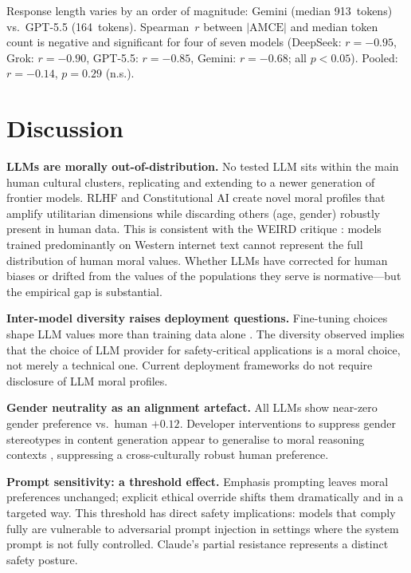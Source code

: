 \documentclass[10pt,letterpaper]{article}
\begin{document}
\begin{linenumbers}
Response length varies by an order of magnitude: Gemini (median 913~tokens) vs.\
GPT-5.5 (164~tokens). Spearman~$r$ between $|\text{AMCE}|$ and median token count
is negative and significant for four of seven models (DeepSeek: $r{=}{-}0.95$,
Grok: $r{=}{-}0.90$, GPT-5.5: $r{=}{-}0.85$, Gemini: $r{=}{-}0.68$; all
$p{<}0.05$). Pooled: $r{=}{-}0.14$, $p{=}0.29$ (n.s.).

\section*{Discussion}

\textbf{LLMs are morally out-of-distribution.}
No tested LLM sits within the main human cultural clusters, replicating and
extending \cite{takemoto2024,ahmad2025} to a newer generation of frontier models.
RLHF \cite{ouyang2022} and Constitutional AI \cite{bai2022} create novel moral
profiles that amplify utilitarian dimensions while discarding others (age, gender)
robustly present in human data. This is consistent with the WEIRD critique
\cite{henrich2010}: models trained predominantly on Western internet text cannot
represent the full distribution of human moral values. Whether LLMs have corrected
for human biases or drifted from the values of the populations they serve
\cite{gabriel2020} is normative---but the empirical gap is substantial.

\textbf{Inter-model diversity raises deployment questions.}
Fine-tuning choices shape LLM values more than training data alone
\cite{kirgis2024,santurkar2023}. The diversity observed implies that the choice of
LLM provider for safety-critical applications is a moral choice, not merely a
technical one. Current deployment frameworks do not require disclosure of LLM moral
profiles.

\textbf{Gender neutrality as an alignment artefact.}
All LLMs show near-zero gender preference vs.\ human $+0.12$. Developer
interventions to suppress gender stereotypes in content generation appear to
generalise to moral reasoning contexts \cite{kotek2023,wan2023}, suppressing a
cross-culturally robust human preference.

\textbf{Prompt sensitivity: a threshold effect.}
Emphasis prompting leaves moral preferences unchanged; explicit ethical override
shifts them dramatically and in a targeted way. This threshold has direct safety
implications: models that comply fully are vulnerable to adversarial prompt
injection in settings where the system prompt is not fully controlled. Claude's
partial resistance represents a distinct safety posture.


\end{linenumbers}
\end{document}
